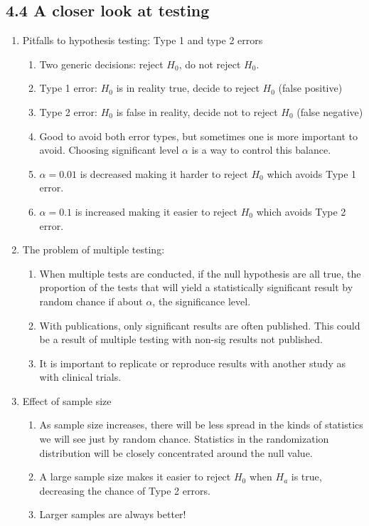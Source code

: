 \documentclass{article}
\begin{document}
\subsection{4.4 A closer look at testing}
\begin{enumerate}

\item Pitfalls to hypothesis testing: Type 1 and type 2 errors
\begin{enumerate}
\item Two generic decisions: reject $H_0$, do not reject $H_0$.
\item Type 1 error: $H_0$ is in reality true, decide to reject $H_0$ (false positive)
\item Type 2 error: $H_0$ is false in reality, decide not to reject $H_0$ (false negative)
\item Good to avoid both error types, but sometimes one is more important to avoid. Choosing significant level $\alpha$ is a way to control this balance.
\item $\alpha = 0.01$ is decreased making it harder to reject $H_0$ which avoids Type 1 error.
\item $\alpha = 0.1$ is increased making it easier to reject $H_0$ which avoids Type 2 error.
\end{enumerate}

\item The problem of multiple testing: 
\begin{enumerate}
\item When multiple tests are conducted, if the null hypothesis are all true, the proportion of the tests that will yield a statistically significant result by random chance if about $\alpha$, the significance level.
\item With publications, only significant results are often published. This could be a result of multiple testing with non-sig results not published.
\item It is important to replicate or reproduce results with another study as with clinical trials.
\end{enumerate}

\item Effect of sample size
\begin{enumerate}
\item As sample size increases, there will be less spread in the kinds of statistics we will see just by random chance. Statistics in the randomization distribution will be closely concentrated around the null value.
\item A large sample size makes it easier to reject $H_0$ when $H_a$ is true, decreasing the chance of Type 2 errors.
\item Larger samples are always better!
\end{enumerate}

\end{enumerate}
\end{document}
